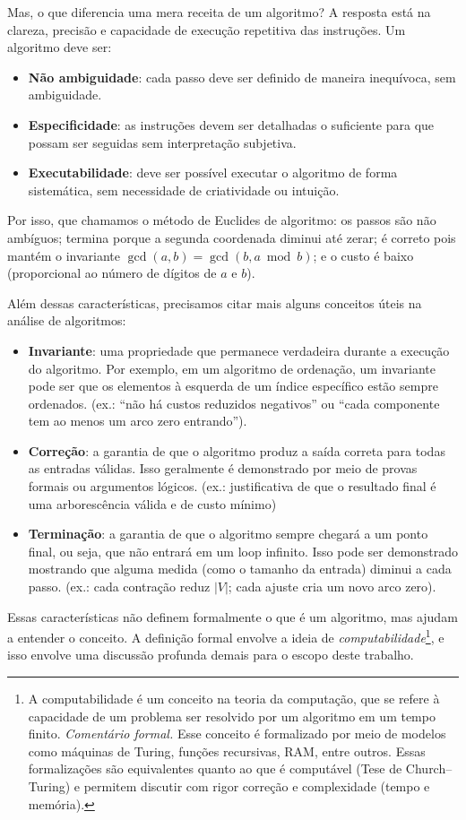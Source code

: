 Mas, o que diferencia uma mera receita de um algoritmo? A resposta está na clareza, precisão e capacidade de execução repetitiva das instruções. Um algoritmo deve ser:
\begin{itemize}\setlength{\itemsep}{2pt}
	\item \textbf{Não ambiguidade}: cada passo deve ser definido de maneira inequívoca, sem ambiguidade.
	\item \textbf{Especificidade}: as instruções devem ser detalhadas o suficiente para que possam ser seguidas sem interpretação subjetiva.
	\item \textbf{Executabilidade}: deve ser possível executar o algoritmo de forma sistemática, sem necessidade de criatividade ou intuição.
\end{itemize}


Por isso, que chamamos o método de Euclides de algoritmo: os passos são não ambíguos; termina porque a segunda coordenada diminui até zerar; é correto pois mantém o invariante $\gcd(a,b)=\gcd(b,a\bmod b)$; e o custo é baixo (proporcional ao número de dígitos de $a$ e $b$).


Além dessas características, precisamos citar mais alguns conceitos úteis na análise de algoritmos:
\begin{itemize}\setlength{\itemsep}{2pt}
	\item \textbf{Invariante}: uma propriedade que permanece verdadeira durante a execução do algoritmo. Por exemplo, em um algoritmo de ordenação, um invariante pode ser que os elementos à esquerda de um índice específico estão sempre ordenados. (ex.: “não há custos reduzidos negativos” ou “cada componente tem ao menos um arco zero entrando”).
	\item \textbf{Correção}: a garantia de que o algoritmo produz a saída correta para todas as entradas válidas. Isso geralmente é demonstrado por meio de provas formais ou argumentos lógicos. (ex.: justificativa de que o resultado final é uma arborescência válida e de custo mínimo)
	\item \textbf{Terminação}: a garantia de que o algoritmo sempre chegará a um ponto final, ou seja, que não entrará em um loop infinito. Isso pode ser demonstrado mostrando que alguma medida (como o tamanho da entrada) diminui a cada passo. (ex.: cada contração reduz $|V|$; cada ajuste cria um novo arco zero).
\end{itemize}


Essas características não definem formalmente o que é um algoritmo, mas ajudam a entender o conceito. A definição formal envolve a ideia de \emph{computabilidade}\footnote{A computabilidade é um conceito na teoria da computação, que se refere à capacidade de um problema ser resolvido por um algoritmo em um tempo finito. \emph{Comentário formal.} Esse conceito é formalizado por meio de modelos como máquinas de Turing, funções recursivas, RAM, entre outros. Essas formalizações são equivalentes quanto ao que é computável (Tese de Church–Turing) e permitem discutir com rigor correção e complexidade (tempo e memória).}, e isso envolve uma discussão profunda demais para o escopo deste trabalho.

